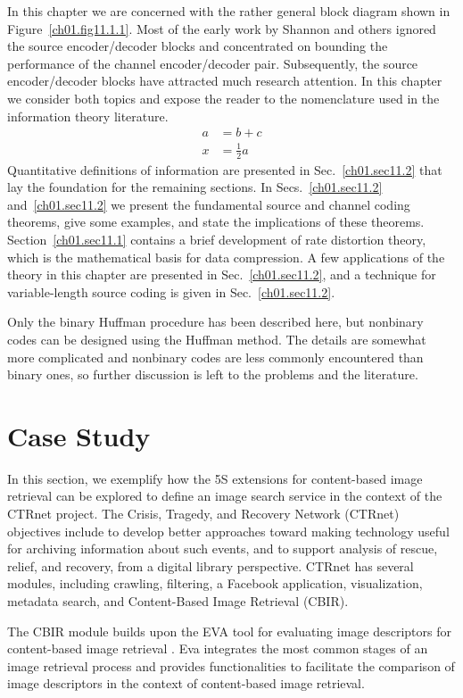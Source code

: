 In this chapter we are concerned with the rather general block diagram
shown in Figure~\ref{ch01.fig11.1.1}. Most of the early work by
Shannon and others ignored the source  encoder/decoder blocks and
concentrated  on bounding the performance of the channel
encoder/decoder pair. Subsequently, the source  encoder/decoder blocks
have attracted much research attention.  In this chapter we consider
both topics and expose the reader to the nomenclature used in the
information theory literature.
\begin{align}
a& = b + c\\
x&= \frac{1}{2} a
\end{align}
Quantitative definitions of information are presented in
Sec.~\ref{ch01.sec11.2} that lay the foundation for the remaining
sections. In Secs.~\ref{ch01.sec11.2} and~\ref{ch01.sec11.2} we present
the fundamental source and channel coding theorems, give some examples,
and state the implications of these theorems.
Section~\ref{ch01.sec11.1} contains a brief development of rate
distortion theory,
which is the mathematical basis for data compression.
A few applications of the theory in this chapter are presented
in Sec.~\ref{ch01.sec11.2}, and a technique for variable-length
source coding is given in Sec.~\ref{ch01.sec11.2}.

Only the binary Huffman procedure has been described here,
but nonbinary codes can be designed using the Huffman method.
The details are somewhat more complicated and nonbinary codes
are less commonly encountered than binary ones,
so further discussion is left to the problems and the literature.

\section{Case Study}
\label{sec:case-study}

In this section, we exemplify how the 5S extensions for content-based image retrieval can be explored to define an image search service in the context of the CTRnet project.
The Crisis, Tragedy, and Recovery Network (CTRnet)~\cite{Balzer2007} objectives include to develop better
approaches toward making technology useful for archiving information about such events, and to support
analysis of rescue, relief, and recovery, from a digital library  perspective. CTRnet has
several modules, including crawling, filtering, a Facebook application, visualization, metadata
search, and Content-Based Image Retrieval (CBIR).

The CBIR module
builds upon the EVA tool for evaluating image descriptors for content-based image retrieval \cite{Bierman2005}. Eva integrates the most common stages of an image retrieval process and provides functionalities to facilitate the comparison of image descriptors in the context of content-based image retrieval.

